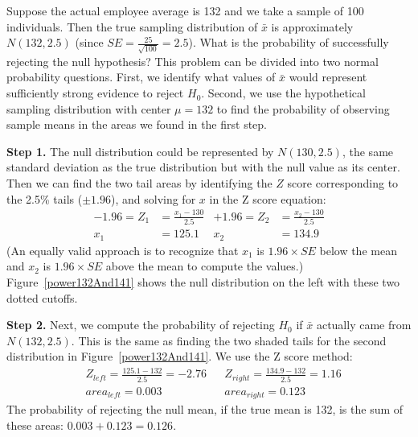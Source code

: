 \begin{example}{Suppose the actual employee average is 132 and we take a sample of 100 individuals. Then the true sampling distribution of $\bar{x}$ is approximately $N(132, 2.5)$ (since $SE = \frac{25}{\sqrt{100}} = 2.5$). What is the probability of successfully rejecting the null hypothesis?}
\label{computePowerIfMuIs132AndMu0Is130}
This problem can be divided into two normal probability questions. First, we identify what values of $\bar{x}$ would represent sufficiently strong evidence to reject $H_0$. Second, we use the hypothetical sampling distribution with center $\mu=132$ to find the probability of observing sample means in the areas we found in the first step.

\textbf{Step 1.} The null distribution could be represented by $N(130, 2.5)$, the same standard deviation as the true distribution but with the null value as its center. Then we can find the two tail areas by identifying the $Z$ score corresponding to the 2.5\% tails ($\pm 1.96$), and solving for $x$ in the Z score equation:
\begin{align*}
-1.96 = Z_1 &= \frac{x_1 - 130}{2.5}
	&+1.96 = Z_2 &= \frac{x_2 - 130}{2.5} \\
x_1 &= 125.1
	&x_2 &= 134.9
\end{align*}
(An equally valid approach is to recognize that $x_1$ is $1.96\times SE$ below the mean and $x_2$ is $1.96\times SE$ above the mean to compute the values.) Figure~\ref{power132And141} shows the null distribution on the left with these two dotted cutoffs.

\textbf{Step 2.} Next, we compute the probability of rejecting $H_0$ if $\bar{x}$ actually came from $N(132, 2.5)$. This is the same as finding the two shaded tails for the second distribution in Figure~\ref{power132And141}. We use the Z score method:
\begin{align*}
&Z_{left} = \frac{125.1 - 132}{2.5} = -2.76
	&&Z_{right} = \frac{134.9 - 132}{2.5} = 1.16 \\
&area_{left} =0.003
	&&area_{right} =0.123
\end{align*}
The probability of rejecting the null mean, if the true mean is 132, is the sum of these areas: $0.003 + 0.123 = 0.126$.
\end{example}

